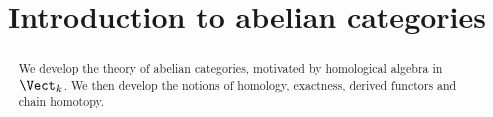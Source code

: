 \documentclass[11pt, A4]{article}
\title{Introduction to abelian categories}
\theoremstyle{definition}
\begin{document}
\makereport

\begin{abstract}
	We develop the theory of abelian categories, motivated by homological algebra in $\Vect_k$. We then develop the notions of homology, exactness, derived functors and chain homotopy.
\end{abstract}

\tableofcontents













\end{document}
